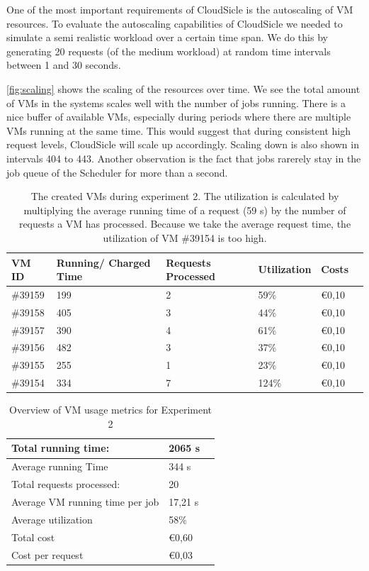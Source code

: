 \documentclass[twocolumn,twoside]{IEEEtran}
\begin{document}
One of the most important requirements of CloudSicle is the autoscaling of VM resources. To evaluate the autoscaling capabilities of CloudSicle we needed to simulate a semi realistic workload over a certain time span. We do this by generating 20 requests (of the medium workload) at random time intervals between 1 and 30 seconds.

\autoref{fig:scaling} shows the scaling of the resources over time. We see the total amount of VMs in the systems scales well with the number of jobs running. There is a nice buffer of available VMs, especially during periods where there are multiple VMs running at the same time. This would suggest that during consistent high request levels, CloudSicle will scale up accordingly. Scaling down is also shown in intervals 404 to 443. Another observation is the fact that jobs rarerely stay in the job queue of the Scheduler for more than a second.


\begin{table}
\label{tab:exp2vms1}
\caption{The created VMs during experiment 2. The utilization is calculated by multiplying the average running time of a request (59 s)  by the number of requests a VM has processed. Because we take the average request time, the utilization of VM \#39154 is too high.}
\begin{tabularx}{92mm}{|l||X|X|X|X|X|}
\hline 
VM ID & Running/ Charged Time & Requests Processed & Utilization & Costs \\
\hline 
\hline 
\#39159 & 199 & 2 & 59\% & \euro{0,10} \\
\hline 
\#39158 & 405 & 3 & 44\% &  \euro{0,10} \\
\hline 
\#39157 & 390 & 4 & 61\% & \euro{0,10} \\
\hline 
\#39156 & 482 & 3 & 37\% &  \euro{0,10} \\
\hline 
\#39155 & 255 & 1 & 23\%  &  \euro{0,10} \\
\hline 
\#39154 & 334 & 7 & 124\% &  \euro{0,10} \\
\hline 
\end{tabularx}
\end{table}


\begin{table}
\label{tab:exp2vms2}
\caption{Overview of VM usage metrics for Experiment 2}
\begin{tabularx}{92mm}{|l||X|X|}
\hline 
Total running time:	& 2065 s \\
\hline 
Average running Time & 344 s \\
\hline 
Total requests processed: & 20 \\
\hline 
Average VM running time per job & 17,21 s \\
\hline 
Average utilization & 58\% \\
\hline 
Total cost & \euro{0,60} \\
\hline 
Cost per request & \euro{0,03} \\
\hline 
\end{tabularx}
\end{table}
\end{document}
